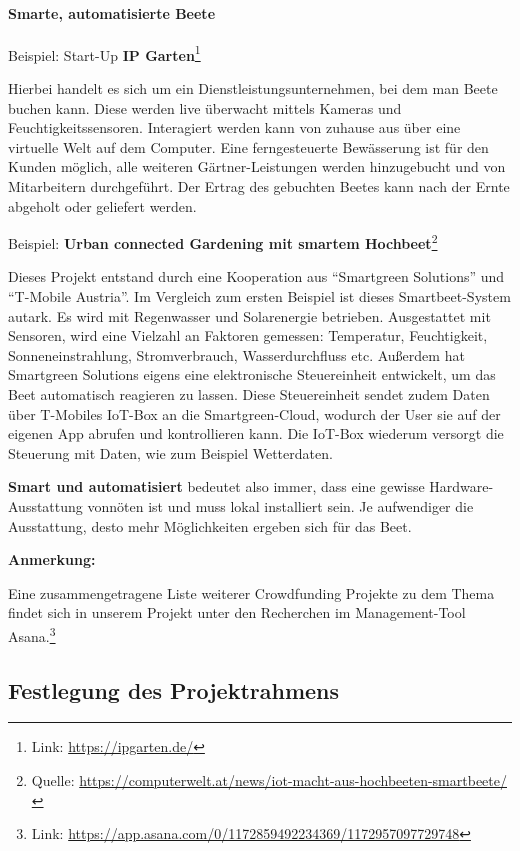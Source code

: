 \hypertarget{smarte-automatisierte-beete}{%
\paragraph{Smarte, automatisierte
Beete}\label{smarte-automatisierte-beete}}

Beispiel: Start-Up \textbf{IP Garten}\footnote{Link:
  \url{https://ipgarten.de/}}

Hierbei handelt es sich um ein Dienstleistungsunternehmen, bei dem man
Beete buchen kann. Diese werden live überwacht mittels Kameras und
Feuchtigkeitssensoren. Interagiert werden kann von zuhause aus über eine
virtuelle Welt auf dem Computer. Eine ferngesteuerte Bewässerung ist für
den Kunden möglich, alle weiteren Gärtner-Leistungen werden hinzugebucht
und von Mitarbeitern durchgeführt. Der Ertrag des gebuchten Beetes kann
nach der Ernte abgeholt oder geliefert werden.

Beispiel: \textbf{Urban connected Gardening mit smartem
Hochbeet}\footnote{Quelle:
  \url{https://computerwelt.at/news/iot-macht-aus-hochbeeten-smartbeete/}}

Dieses Projekt entstand durch eine Kooperation aus ``Smartgreen
Solutions'' und ``T-Mobile Austria''. Im Vergleich zum ersten Beispiel
ist dieses Smartbeet-System autark. Es wird mit Regenwasser und
Solarenergie betrieben. Ausgestattet mit Sensoren, wird eine Vielzahl an
Faktoren gemessen: Temperatur, Feuchtigkeit, Sonneneinstrahlung,
Stromverbrauch, Wasserdurchfluss etc. Außerdem hat Smartgreen Solutions
eigens eine elektronische Steuereinheit entwickelt, um das Beet
automatisch reagieren zu lassen. Diese Steuereinheit sendet zudem Daten
über T-Mobiles IoT-Box an die Smartgreen-Cloud, wodurch der User sie auf
der eigenen App abrufen und kontrollieren kann. Die IoT-Box wiederum
versorgt die Steuerung mit Daten, wie zum Beispiel Wetterdaten.

\textbf{Smart und automatisiert} bedeutet also immer, dass eine gewisse
Hardware-Ausstattung vonnöten ist und muss lokal installiert sein. Je
aufwendiger die Ausstattung, desto mehr Möglichkeiten ergeben sich für
das Beet.

\textbf{Anmerkung:}

Eine zusammengetragene Liste weiterer Crowdfunding Projekte zu dem Thema
findet sich in unserem Projekt unter den Recherchen im Management-Tool
Asana.\footnote{Link:
  \url{https://app.asana.com/0/1172859492234369/1172957097729748}}

\hypertarget{festlegung-des-projektrahmens}{%
\subsection{Festlegung des
Projektrahmens}\label{festlegung-des-projektrahmens}}


